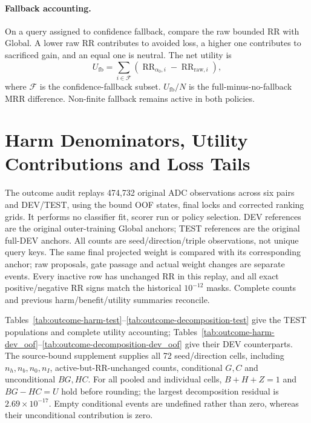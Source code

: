 \documentclass[11pt,a4paper]{article}
\newcommand{\RR}{\operatorname{RR}}
\begin{document}
\paragraph{Fallback accounting.}
On a query assigned to confidence fallback, compare the raw bounded RR with Global. A lower raw RR contributes to avoided loss, a higher one contributes to sacrificed gain, and an equal one is neutral. The net utility is
\begin{equation}
U_{\mathrm{fb}}=\sum_{i\in\mathcal F}(\RR_{\alpha_0,i}-\RR_{\mathrm{raw},i}),
\end{equation}
where $\mathcal F$ is the confidence-fallback subset. $U_{\mathrm{fb}}/N$ is the full-minus-no-fallback MRR difference. Non-finite fallback remains active in both policies.

\FloatBarrier
\section{Harm Denominators, Utility Contributions and Loss Tails}
\label{app:outcome-risk}
The outcome audit replays 474,732 original ADC observations across six pairs and DEV/TEST, using the bound OOF states, final locks and corrected ranking grids. It performs no classifier fit, scorer run or policy selection. DEV references are the original outer-training Global anchors; TEST references are the original full-DEV anchors. All counts are seed/direction/triple observations, not unique query keys. The same final projected weight is compared with its corresponding anchor; raw proposals, gate passage and actual weight changes are separate events. Every inactive row has unchanged RR in this replay, and all exact positive/negative RR signs match the historical $10^{-12}$ masks. Complete counts and previous harm/benefit/utility summaries reconcile.

Tables~\ref{tab:outcome-harm-test}--\ref{tab:outcome-decomposition-test} give the TEST populations and complete utility accounting; Tables~\ref{tab:outcome-harm-dev_oof}--\ref{tab:outcome-decomposition-dev_oof} give their DEV counterparts. The source-bound supplement supplies all 72 seed/direction cells, including $n_h,n_b,n_0,n_I$, active-but-RR-unchanged counts, conditional $G,C$ and unconditional $BG,HC$. For all pooled and individual cells, $B+H+Z=1$ and $BG-HC=U$ hold before rounding; the largest decomposition residual is $2.69\times10^{-17}$. Empty conditional events are undefined rather than zero, whereas their unconditional contribution is zero.


\end{document}
